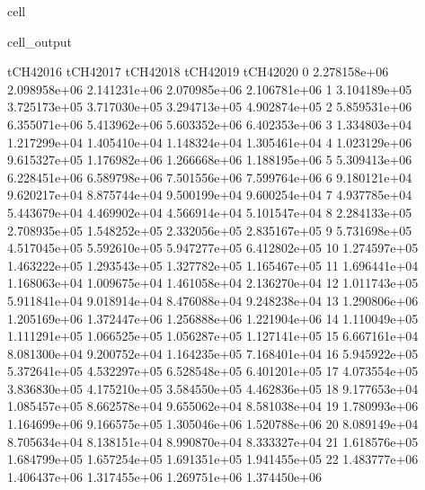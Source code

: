 \documentclass[letterpaper,10pt,english]{jupyterBook}
\begin{document}
\begin{sphinxuseclass}{cell}
\begin{sphinxVerbatimOutput}
\begin{sphinxuseclass}{cell_output}
\begin{sphinxVerbatim}[commandchars=\\\{\}]
       tCH4\PYGZus{}2016     tCH4\PYGZus{}2017     tCH4\PYGZus{}2018     tCH4\PYGZus{}2019     tCH4\PYGZus{}2020  \PYGZbs{}
0   2.278158e+06  2.098958e+06  2.141231e+06  2.070985e+06  2.106781e+06   
1   3.104189e+05  3.725173e+05  3.717030e+05  3.294713e+05  4.902874e+05   
2   5.859531e+06  6.355071e+06  5.413962e+06  5.603352e+06  6.402353e+06   
3   1.334803e+04  1.217299e+04  1.405410e+04  1.148324e+04  1.305461e+04   
4   1.023129e+06  9.615327e+05  1.176982e+06  1.266668e+06  1.188195e+06   
5   5.309413e+06  6.228451e+06  6.589798e+06  7.501556e+06  7.599764e+06   
6   9.180121e+04  9.620217e+04  8.875744e+04  9.500199e+04  9.600254e+04   
7   4.937785e+04  5.443679e+04  4.469902e+04  4.566914e+04  5.101547e+04   
8   2.284133e+05  2.708935e+05  1.548252e+05  2.332056e+05  2.835167e+05   
9   5.731698e+05  4.517045e+05  5.592610e+05  5.947277e+05  6.412802e+05   
10  1.274597e+05  1.463222e+05  1.293543e+05  1.327782e+05  1.165467e+05   
11  1.696441e+04  1.168063e+04  1.009675e+04  1.461058e+04  2.136270e+04   
12  1.011743e+05  5.911841e+04  9.018914e+04  8.476088e+04  9.248238e+04   
13  1.290806e+06  1.205169e+06  1.372447e+06  1.256888e+06  1.221904e+06   
14  1.110049e+05  1.111291e+05  1.066525e+05  1.056287e+05  1.127141e+05   
15  6.667161e+04  8.081300e+04  9.200752e+04  1.164235e+05  7.168401e+04   
16  5.945922e+05  5.372641e+05  4.532297e+05  6.528548e+05  6.401201e+05   
17  4.073554e+05  3.836830e+05  4.175210e+05  3.584550e+05  4.462836e+05   
18  9.177653e+04  1.085457e+05  8.662578e+04  9.655062e+04  8.581038e+04   
19  1.780993e+06  1.164699e+06  9.166575e+05  1.305046e+06  1.520788e+06   
20  8.089149e+04  8.705634e+04  8.138151e+04  8.990870e+04  8.333327e+04   
21  1.618576e+05  1.684799e+05  1.657254e+05  1.691351e+05  1.941455e+05   
22  1.483777e+06  1.406437e+06  1.317455e+06  1.269751e+06  1.374450e+06   


\end{sphinxVerbatim}
\end{sphinxuseclass}
\end{sphinxVerbatimOutput}
\end{sphinxuseclass}
\end{document}
